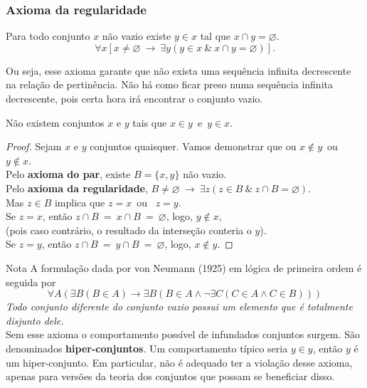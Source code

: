       \subsubsection{Axioma da regularidade}
         \begin{stat}
            Para todo conjunto $x$ não vazio existe $y \in x$ tal que $x \cap y = \varnothing$.
            $$ \forall x [x \neq \varnothing\ \rightarrow\ \exists y (y \in x\ \&\ x \cap y = \varnothing)].$$
         \end{stat}
         Ou seja, esse axioma garante que não exista uma sequência infinita decrescente na relação de pertinência. Não há como ficar preso numa sequência infinita decrescente, pois certa hora irá encontrar o conjunto vazio.
         \begin{theorem}
            Não existem conjuntos $x$ e $y$ tais que $x \in y$\ e\ $y \in x$.
         \end{theorem}
         \begin{proof}
            Sejam $x$ e $y$ conjuntos quaisquer.
            Vamos demonstrar que ou $x \notin y$\ ou\ $y \notin x$.\\
            Pelo \textbf{axioma do par}, existe $B = \{x,y\}$ não vazio.\\
            Pelo \textbf{axioma da regularidade}, $B \neq \varnothing\ \rightarrow\ \exists z (z \in B\ \&\ z \cap B = \varnothing).$\\
            Mas $z \in B$ implica que $z = x$\ ou \ $z = y$.\\            
            Se $z=x$, então $z \cap B\ =\ x \cap B\ =\ \varnothing$, logo, $y \notin x$,\\
            (pois caso contrário, o resultado da interseção conteria o $y$).\\
            Se $z=y$, então $z \cap B\ =\ y \cap B\ =\ \varnothing$, logo, $x \notin y$.
         \end{proof}
         \begin{mymdframed}{Nota}
            A formulação dada por von Neumann (1925) em lógica de primeira ordem é seguida por
            $$\forall A(\exists B(B\in A)\rightarrow \exists B(B\in A\land \neg \exists C(C\in A\land C\in B)))$$
            \emph{Todo conjunto diferente do conjunto vazio possui um elemento que é totalmente disjunto dele.}\\
            Sem esse axioma o comportamento possível de infundados conjuntos surgem. São denominados \textbf{hiper-conjuntos}. Um comportamento típico seria $y \in y$, então $y$ é um hiper-conjunto. Em particular, não é adequado ter a violação desse axioma, apenas para versões da teoria dos conjuntos que possam se beneficiar disso.
         \end{mymdframed}
